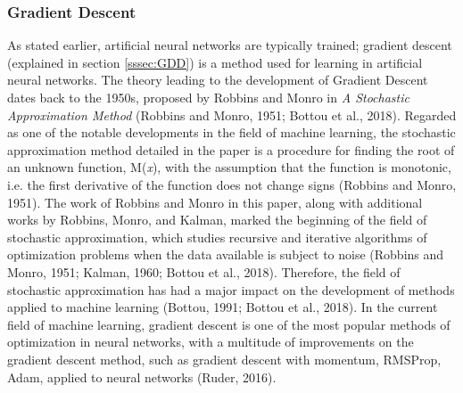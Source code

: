 \documentclass[11pt,titlepage]{article}
\begin{document}
\subsubsection{Gradient Descent}
As stated earlier, artificial neural networks are typically trained; gradient descent (explained in section \ref{sssec:GDD}) is a method used for learning in artificial neural networks. The theory leading to the development of Gradient Descent dates back to the 1950s, proposed by Robbins and Monro in \textit{A Stochastic Approximation Method} (Robbins and Monro, 1951; Bottou et al., 2018). Regarded as one of the notable developments in the field of machine learning, the stochastic approximation method detailed in the paper is a procedure for finding the root of an unknown function, M(\textit{x}), with the assumption that the function is monotonic, i.e. the first derivative of the function does not change signs (Robbins and Monro, 1951). The work of Robbins and Monro in this paper, along with additional works by Robbins, Monro, and Kalman, marked the beginning of the field of stochastic approximation, which studies recursive and iterative algorithms of optimization problems when the data available is subject to noise (Robbins and Monro, 1951; Kalman, 1960; Bottou et al., 2018). Therefore, the field of stochastic approximation has had a major impact on the development of methods applied to machine learning (Bottou, 1991; Bottou et al., 2018). In the current field of machine learning, gradient descent is one of the most popular methods of optimization in neural networks, with a multitude of improvements on the gradient descent method, such as gradient descent with momentum, RMSProp, Adam, applied to neural networks (Ruder, 2016).\par
\end{document}
